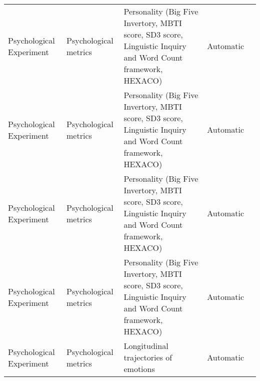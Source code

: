 \begin{small}
\begin{center}
\begin{longtable}{@{}p{}p{}p{}p{}p{}@{}}
Psychological Experiment & Psychological metrics & Personality (Big Five Invertory, MBTI score, SD3 score, Linguistic Inquiry and Word Count framework, HEXACO)                                                                                                & Automatic & \cite{He2024AFSPPAF}                                                                                                                                                                                                                                                                                                                                                                                                \\
Psychological Experiment & Psychological metrics & Personality (Big Five Invertory, MBTI score, SD3 score, Linguistic Inquiry and Word Count framework, HEXACO)                                                                                                & Automatic & \cite{deWinter2024TheUO}                                                                                                        \\
Psychological Experiment & Psychological metrics & Personality (Big Five Invertory, MBTI score, SD3 score, Linguistic Inquiry and Word Count framework, HEXACO)                                                                                                & Automatic & \cite{bose2024assessing}                                                                                                                                                                                                                                                                                                                                                                                      \\
Psychological Experiment & Psychological metrics & Personality (Big Five Invertory, MBTI score, SD3 score, Linguistic Inquiry and Word Count framework, HEXACO)                                                                                                & Automatic & \cite{Jiang2023PersonaLLMIT}                                                                                                                                                                                                                                                                                                                                                                              \\
Psychological Experiment & Psychological metrics & Longitudinal trajectories of emotions                                                                                                                                                                       & Automatic & \cite{de2025introducing}                                                                                                                                                                                                                                                                                                                \\

\end{longtable}
\end{center}
\end{small}
